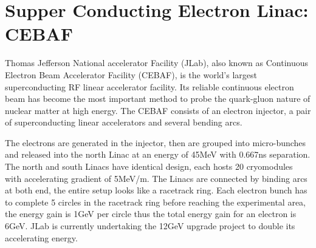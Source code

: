 \documentclass[letterpaper, 10pt] {article}
\begin{document}
\setlength{\parskip}{0.5cm plus4mm minus3mm}

\section{Supper Conducting Electron Linac: CEBAF}
Thomas Jefferson National accelerator Facility (JLab), also known as Continuous Electron Beam Accelerator Facility (CEBAF), is the world's largest superconducting RF linear accelerator facility. Its reliable continuous electron beam has become the most important method to probe the quark-gluon nature of nuclear matter at high energy. The CEBAF consists of an electron injector, a pair of superconducting linear accelerators and several bending arcs. 



The electrons are generated in the injector, then are grouped into micro-bunches and released into the north Linac at an energy of 45MeV with 0.667ns separation. The north and south Linacs have identical design, each hosts 20 cryomodules with accelerating gradient of 5MeV/m. The Linacs are connected by binding arcs at both end, the entire setup looks like a racetrack ring. Each electron bunch has to complete 5 circles in the racetrack ring before reaching the experimental area, the energy gain is 1GeV per circle thus the total energy gain for an electron is 6GeV. JLab is currently undertaking the 12GeV upgrade project to double its accelerating energy. 
\end{document}
